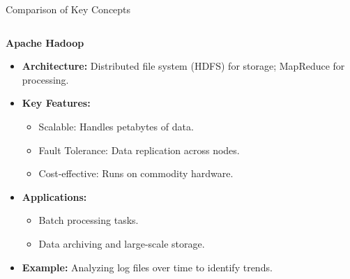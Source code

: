 \documentclass[aspectratio=169]{beamer}
\begin{document}
\begin{frame}{Comparison of Key Concepts}
    \begin{columns}
        \begin{column}{0.5\textwidth}
            \textbf{Apache Hadoop}
            \begin{itemize}
                \item \textbf{Architecture:} Distributed file system (HDFS) for storage; MapReduce for processing.
                \item \textbf{Key Features:}
                    \begin{itemize}
                        \item Scalable: Handles petabytes of data.
                        \item Fault Tolerance: Data replication across nodes.
                        \item Cost-effective: Runs on commodity hardware.
                    \end{itemize}
                \item \textbf{Applications:}
                    \begin{itemize}
                        \item Batch processing tasks.
                        \item Data archiving and large-scale storage.
                    \end{itemize}
                \item \textbf{Example:} Analyzing log files over time to identify trends.
            \end{itemize}
        \end{column}
        

\end{columns}
\end{frame}
\end{document}
